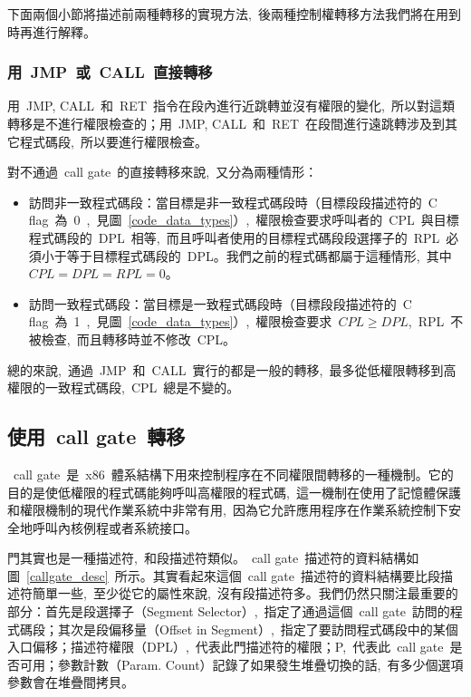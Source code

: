 下面兩個小節將描述前兩種轉移的實現方法,~後兩種控制權轉移方法我們將在用到時再進行解釋。

\subsubsection{用~JMP~或~CALL~直接轉移}

用~JMP, CALL~和~RET~指令在段內進行近跳轉並沒有權限的變化,~所以對這類轉移是不進行權限檢查的；用~JMP, CALL~和~RET~在段間進行遠跳轉涉及到其它程式碼段,~所以要進行權限檢查。

對不通過~call gate~的直接轉移來說,~又分為兩種情形：

\begin{itemize}
\item{訪問非一致程式碼段}：當目標是非一致程式碼段時（目標段段描述符的~C flag~為~0~,~見圖~\ref{code_data_types}）,~權限檢查要求呼叫者的~CPL~與目標程式碼段的~DPL~相等,~而且呼叫者使用的目標程式碼段段選擇子的~RPL~必須小于等于目標程式碼段的~DPL。我們之前的程式碼都屬于這種情形,~其中~$CPL=DPL=RPL=0$。
\item{訪問一致程式碼段}：當目標是一致程式碼段時（目標段段描述符的~C flag~為~1~,~見圖~\ref{code_data_types}）,~權限檢查要求~$CPL \ge DPL$,~RPL~不被檢查,~而且轉移時並不修改~CPL。
\end{itemize}

總的來說,~通過~JMP~和~CALL~實行的都是一般的轉移,~最多從低權限轉移到高權限的一致程式碼段,~CPL~總是不變的。

\subsection{使用~call gate~轉移}\label{CHpm_callgate}

~call gate~是~x86~體系結構下用來控制程序在不同權限間轉移的一種機制。它的目的是使低權限的程式碼能夠呼叫高權限的程式碼,~這一機制在使用了記憶體保護和權限機制的現代作業系統中非常有用,~因為它允許應用程序在作業系統控制下安全地呼叫內核例程或者系統接口。


門其實也是一種描述符,~和段描述符類似。~call gate~描述符的資料結構如圖~\ref{callgate_desc}~所示。其實看起來這個~call gate~描述符的資料結構要比段描述符簡單一些,~至少從它的屬性來說,~沒有段描述符多。我們仍然只關注最重要的部分：首先是段選擇子（Segment Selector）,~指定了通過這個~call gate~訪問的程式碼段；其次是段偏移量（Offset in Segment）,~指定了要訪問程式碼段中的某個入口偏移；描述符權限（DPL）,~代表此門描述符的權限；P,~代表此~call gate~是否可用；參數計數（Param. Count）記錄了如果發生堆疊切換的話,~有多少個選項參數會在堆疊間拷貝。

